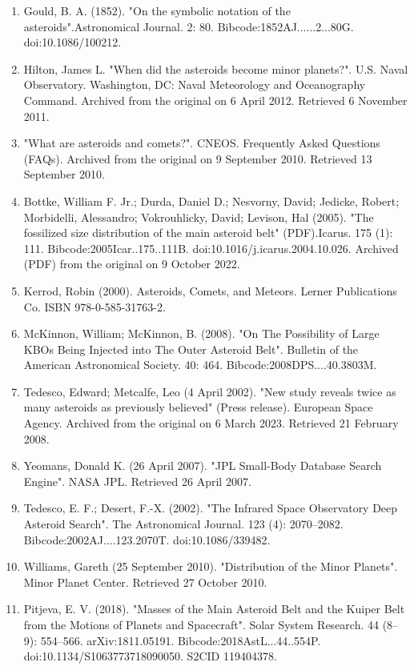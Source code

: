 \begin{enumerate}
\item Gould, B. A. (1852). "On the symbolic notation of the asteroids".Astronomical Journal. 2: 80. Bibcode:1852AJ......2...80G. doi:10.1086/100212.
\item Hilton, James L. "When did the asteroids become minor planets?". U.S. Naval Observatory. Washington, DC: Naval Meteorology and Oceanography Command. Archived from the original on 6 April 2012. Retrieved 6 November 2011.
\item "What are asteroids and comets?". CNEOS. Frequently Asked Questions (FAQs). Archived from the original on 9 September 2010. Retrieved 13 September 2010.
\item Bottke, William F. Jr.; Durda, Daniel D.; Nesvorny, David; Jedicke, Robert; Morbidelli, Alessandro; Vokrouhlicky, David; Levison, Hal (2005). "The fossilized size distribution of the main asteroid belt" (PDF).Icarus. 175 (1): 111. Bibcode:2005Icar..175..111B. doi:10.1016/j.icarus.2004.10.026. Archived (PDF) from the original on 9 October 2022.
\item Kerrod, Robin (2000). Asteroids, Comets, and Meteors. Lerner Publications Co. ISBN 978-0-585-31763-2.
\item McKinnon, William; McKinnon, B. (2008). "On The Possibility of Large KBOs Being Injected into The Outer Asteroid Belt". Bulletin of the American Astronomical Society. 40: 464. Bibcode:2008DPS....40.3803M.
\item Tedesco, Edward; Metcalfe, Leo (4 April 2002). "New study reveals twice as many asteroids as previously believed" (Press release). European Space Agency. Archived from the original on 6 March 2023. Retrieved 21 February 2008.
\item Yeomans, Donald K. (26 April 2007). "JPL Small-Body Database Search Engine". NASA JPL. Retrieved 26 April 2007.
\item Tedesco, E. F.; Desert, F.-X. (2002). "The Infrared Space Observatory Deep Asteroid Search". The Astronomical Journal. 123 (4): 2070–2082. Bibcode:2002AJ....123.2070T. doi:10.1086/339482.
\item Williams, Gareth (25 September 2010). "Distribution of the Minor Planets". Minor Planet Center. Retrieved 27 October 2010.
\item Pitjeva, E. V. (2018). "Masses of the Main Asteroid Belt and the Kuiper Belt from the Motions of Planets and Spacecraft". Solar System Research. 44 (8–9): 554–566. arXiv:1811.05191. Bibcode:2018AstL...44..554P. doi:10.1134/S1063773718090050. S2CID 119404378.
\end{enumerate}
